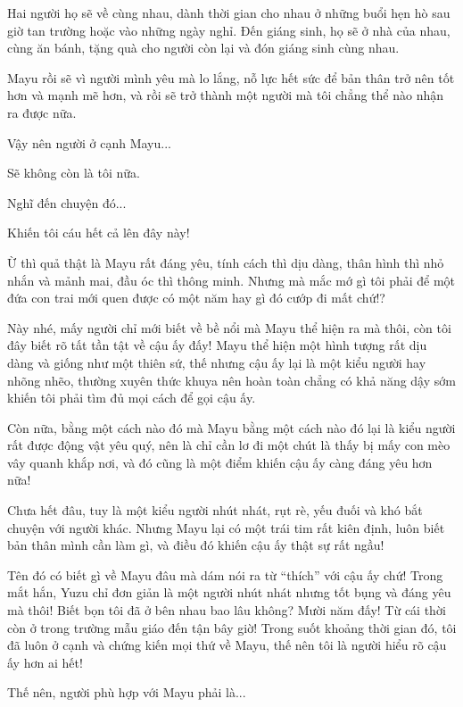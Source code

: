 {    Hai người họ sẽ về cùng nhau, dành thời gian cho nhau ở những buổi hẹn
    hò sau giờ tan trường hoặc vào những ngày nghỉ. Đến giáng sinh, họ sẽ ở
    nhà của nhau, cùng ăn bánh, tặng quà cho người còn lại và đón giáng sinh
    cùng nhau.

    Mayu rồi sẽ vì người mình yêu mà lo lắng, nỗ lực hết sức để bản thân trở
    nên tốt hơn và mạnh mẽ hơn, và rồi sẽ trở thành một người mà tôi chẳng
    thể nào nhận ra được nữa.

    Vậy nên người ở cạnh Mayu...

    Sẽ không còn là tôi nữa.

    Nghĩ đến chuyện đó...

    Khiến tôi cáu hết cả lên đây này!

    Ừ thì quả thật là Mayu rất đáng yêu, tính cách thì dịu dàng, thân hình
    thì nhỏ nhắn và mảnh mai, đầu óc thì thông minh. Nhưng mà mắc mớ gì tôi
    phải để một đứa con trai mới quen được có một năm hay gì đó cướp đi mất
    chứ!?

    Này nhé, mấy người chỉ mới biết về bề nổi mà Mayu thể hiện ra mà thôi,
    còn tôi đây biết rõ tất tần tật về cậu ấy đấy! Mayu thể hiện một hình
    tượng rất dịu dàng và giống như một thiên sứ, thế nhưng cậu ấy lại là
    một kiểu người hay nhõng nhẽo, thường xuyên thức khuya nên hoàn toàn
    chẳng có khả năng dậy sớm khiến tôi phải tìm đủ mọi cách để gọi cậu ấy.

    Còn nữa, bằng một cách nào đó mà Mayu bằng một cách nào đó lại là kiểu
    người rất được động vật yêu quý, nên là chỉ cần lơ đi một chút là thấy
    bị mấy con mèo vây quanh khắp nơi, và đó cũng là một điểm khiến cậu ấy
    càng đáng yêu hơn nữa!

    Chưa hết đâu, tuy là một kiểu người nhút nhát, rụt rè, yếu đuối và khó
    bắt chuyện với người khác. Nhưng Mayu lại có một trái tim rất kiên định,
    luôn biết bản thân mình cần làm gì, và điều đó khiến cậu ấy thật sự rất
    ngầu!

    Tên đó có biết gì về Mayu đâu mà dám nói ra từ ``thích'' với cậu ấy chứ!
    Trong mắt hắn, Yuzu chỉ đơn giản là một người nhút nhát nhưng tốt bụng
    và đáng yêu mà thôi! Biết bọn tôi đã ở bên nhau bao lâu không? Mười năm
    đấy! Từ cái thời còn ở trong trường mẫu giáo đến tận bây giờ! Trong suốt
    khoảng thời gian đó, tôi đã luôn ở cạnh và chứng kiến mọi thứ về Mayu,
    thế nên tôi là người hiểu rõ cậu ấy hơn ai hết!

    Thế nên, người phù hợp với Mayu phải là...

}
